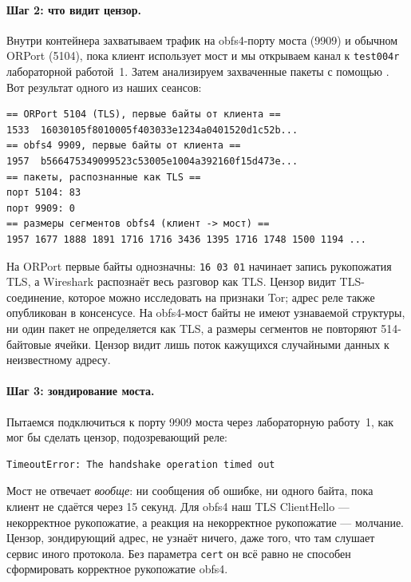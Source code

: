 \paragraph{Шаг 2: что видит цензор.} Внутри контейнера захватываем трафик  на obfs4-порту моста (9909) и обычном ORPort (5104), пока клиент использует мост и мы открываем канал к \texttt{test004r} лабораторной работой~1. Затем анализируем захваченные пакеты с помощью . Вот результат одного из наших сеансов:
\begin{lstlisting}[numbers=none]
== ORPort 5104 (TLS), первые байты от клиента ==
1533  16030105f8010005f403033e1234a0401520d1c52b...
== obfs4 9909, первые байты от клиента ==
1957  b566475349099523c53005e1004a392160f15d473e...
== пакеты, распознанные как TLS ==
порт 5104: 83
порт 9909: 0
== размеры сегментов obfs4 (клиент -> мост) ==
1957 1677 1888 1891 1716 1716 3436 1395 1716 1748 1500 1194 ...
\end{lstlisting}
На ORPort первые байты однозначны: \texttt{16 03 01} начинает запись рукопожатия TLS, а Wireshark распознаёт весь разговор как TLS. Цензор видит TLS-соединение, которое можно исследовать на признаки Tor; адрес реле также опубликован в консенсусе. На obfs4-мост байты не имеют узнаваемой структуры, ни один пакет не определяется как TLS, а размеры сегментов не повторяют 514-байтовые ячейки. Цензор видит лишь поток кажущихся случайными данных к неизвестному адресу.

\paragraph{Шаг 3: зондирование моста.} Пытаемся подключиться к порту 9909 моста через лабораторную работу~1, как мог бы сделать цензор, подозревающий реле:
\begin{lstlisting}[numbers=none]
TimeoutError: The handshake operation timed out
\end{lstlisting}
Мост не отвечает \emph{вообще}: ни сообщения об ошибке, ни одного байта, пока клиент не сдаётся через 15 секунд. Для obfs4 наш TLS ClientHello --- некорректное рукопожатие, а реакция на некорректное рукопожатие --- молчание. Цензор, зондирующий адрес, не узнаёт ничего, даже того, что там слушает сервис иного протокола. Без параметра \texttt{cert} он всё равно не способен сформировать корректное рукопожатие obfs4.

